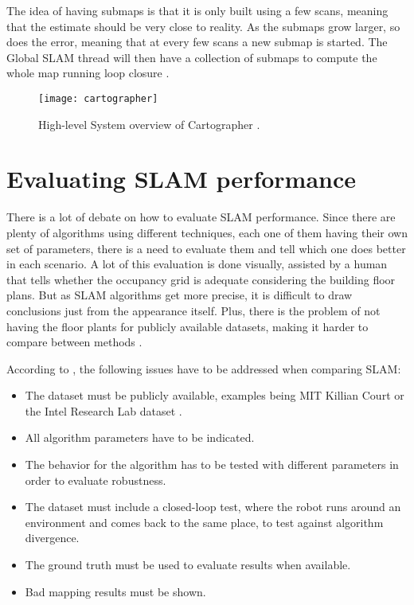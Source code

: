 The idea of having submaps is that it is only built using a few scans, meaning that the estimate should be very close to reality. As the submaps grow larger, so does the error, meaning that at every few scans a new submap is started. The Global SLAM thread will then have a collection of submaps to compute the whole map running loop closure \cite{cartographer2016google}.

\begin{figure}[!ht]
    \centering
    \texttt{[image: cartographer]}
    \caption{High-level System overview of Cartographer \cite{cartographerimage}.}
    \label{fig:cartographer}
\end{figure}

\section{Evaluating SLAM performance} \label{sec:evaluating}

There is a lot of debate on how to evaluate SLAM performance. Since there are plenty of algorithms using different techniques, each one of them having their own set of parameters, there is a need to evaluate them and tell which one does better in each scenario. A lot of this evaluation is done visually, assisted by a human that tells whether the occupancy grid is adequate considering the building floor plans. But as SLAM algorithms get more precise, it is difficult to draw conclusions just from the appearance itself. Plus, there is the problem of not having the floor plants for publicly available datasets, making it harder to compare between methods \cite{kummerle2009measuring}.

According to \citeauthor{amigoni2007good}, the following issues have to be addressed when comparing SLAM:

\begin{itemize}
    \item The dataset must be publicly available, examples being MIT Killian Court or the Intel Research Lab dataset \cite{kummerle2009measuring}.
    \item All algorithm parameters have to be indicated.
    \item The behavior for the algorithm has to be tested with different parameters in order to evaluate robustness.
    \item The dataset must include a closed-loop test, where the robot runs around an environment and comes back to the same place, to test against algorithm divergence.
    \item The ground truth must be used to evaluate results when available.
    \item Bad mapping results must be shown.
\end{itemize}

